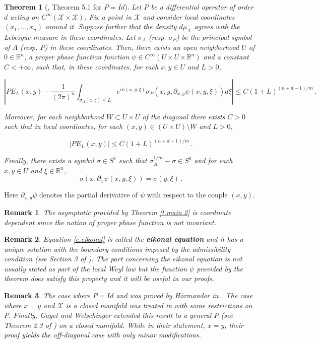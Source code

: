 \documentclass[10pt,twoside]{article}
\newcommand{\R}{\mathbb{R}}
\newcommand{\man}{\mathcal{X}}
\newtheorem{theorem}{Theorem}
\numberwithin{theorem}{section}
\newtheorem{remark}{Remark}
\begin{document}
\begin{theorem}[\cite{ho68}, Theorem 5.1 for $P=Id$]\label{t.hormander}
Let $P$ be a differential operator of order $d$ acting on $C^\infty(\man\times\man)$. Fix a point in $\man$ and consider local coordinates $(x_1,\dots,x_n)$ around it. Suppose further that the density $d\mu_{\man}$ agrees with the Lebesgue measure in these coordinates. Let $\sigma_A$ (resp. $\sigma_P$) be the principal symbol of $A$ (resp. $P$) in these coordinates. Then, there exists an open neighborhood $U$ of $0\in\R^n$, a proper phase function function $\psi\in C^\infty(U\times U\times\R^n)$ and a constant $C<+\infty$, such that, in these coordinates, for each $x,y\in U$ and $L>0$,

\[
\left|PE_L(x,y)-\frac{1}{(2\pi)^n}\int_{\sigma_A(x,\xi)\leq L}e^{i\psi(x,y,\xi)}\sigma_P(x,y,\partial_{x,y}\psi(x,y,\xi))d\xi\right|\leq C(1+L)^{(n+d-1)/m}\, .
\]

Moreover, for each neighborhood $W\subset U\times U$ of the diagonal there exists $C>0$ such that in local coordinates, for each $(x,y)\in \left(U\times U\right)\setminus W$ and $L>0$,

\[
\Big|PE_L(x,y)\Big|\leq C(1+L)^{(n+d-1)/m}\, .
\]

Finally, there exists a symbol $\sigma\in S^1$ such that $\sigma_A^{1/m}-\sigma\in S^0$ and for each $x,y\in U$ and $\xi\in\R^n$,
\begin{equation}\label{e.eikonal}
\sigma(x,\partial_x\psi(x,y,\xi))=\sigma(y,\xi)\, .
\end{equation}
\end{theorem}
Here $\partial_{x,y}\psi$ denotes the partial derivative of $\psi$ with respect to the couple $(x,y)$.
\begin{remark}
The asymptotic provided by Theorem \ref{t.main.2} is coordinate dependent since the notion of proper phase function is not invariant.
\end{remark}
\begin{remark}
Equation \eqref{e.eikonal} is called the \textbf{eikonal equation} and it has a unique solution with the boundary conditions imposed by the admissibility condition (see Section 3 of \cite{ho68}). The part concerning the eikonal equation is not usually stated as part of the local Weyl law but the function $\psi$ provided by the theorem does satisfy this property and it will be useful in our proofs.
\end{remark}
\begin{remark}
The case where $P=Id$ and was proved by H\"ormander in \cite{ho68}. The case where $x=y$ and $\man$ is a closed manifold was treated in \cite{sava_adep} with some restrictions on $P$. Finally, Gayet and Welschinger extended this result to a general $P$ (see Theorem 2.3 of \cite{gawe14}) on a closed manifold. While in their statement, $x=y$, their proof yields the off-diagonal case with only minor modifications.
\end{remark}
\end{document}
